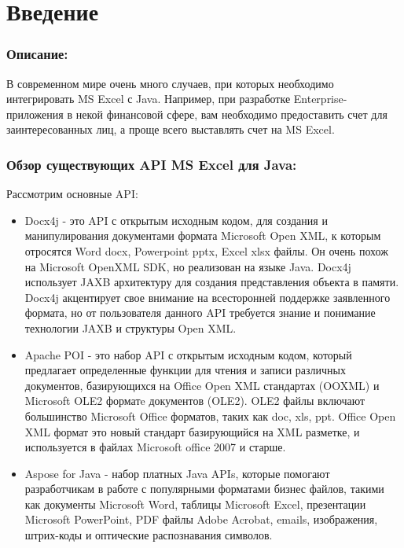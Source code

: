


\chapter*{Введение}
\label{sec:afterwords}

\subsection*{Описание:}

В современном мире очень много случаев, при которых необходимо интегрировать MS
Excel с Java. Например, при разработке Enterprise-приложения в некой финансовой
сфере, вам необходимо предоставить счет для заинтересованных лиц, а проще всего
выставлять счет на MS Excel.

\subsection*{Обзор существующих API MS Excel для Java:}


Рассмотрим основные API\cite{APIMS}:
\begin{itemize}
	\item Docx4j - это  API с открытым исходным кодом, для создания и манипулирования документами формата Microsoft Open XML, к которым отросятся Word docx, Powerpoint pptx, Excel xlsx файлы. Он очень похож на Microsoft OpenXML SDK, но реализован на языке Java. Docx4j использует JAXB архитектуру для создания представления объекта в памяти. Docx4j акцентирует свое внимание на всесторонней поддержке заявленного формата, но от пользователя данного API требуется знание и понимание технологии JAXB и структуры Open XML.
	\item Apache POI - это набор API с открытым исходным кодом, который предлагает определенные функции для чтения и записи различных документов, базирующихся на Office Open XML стандартах (OOXML) и Microsoft OLE2 форматe документов (OLE2). OLE2 файлы включают большинство Microsoft Office форматов, таких как doc, xls, ppt. Office Open XML формат это новый стандарт базирующийся на XML разметке, и используется в файлах Microsoft office 2007 и старше.
	\item Aspose for Java - набор платных Java APIs, которые помогают разработчикам в работе с популярными форматами бизнес файлов, такими как документы Microsoft Word, таблицы Microsoft Excel, презентации Microsoft PowerPoint, PDF файлы Adobe Acrobat, emails, изображения, штрих-коды и оптические распознавания символов.

\end{itemize}
 


